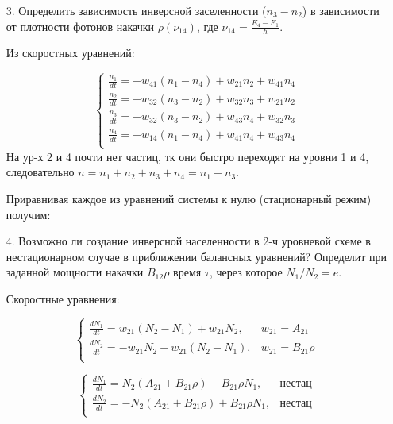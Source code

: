 \documentclass[a4paper]{article}
\begin{document}
\begin{itemize}
	\item[3.] Определить зависимость инверсной заселенности ($n_3-n_2$) в зависимости от плотности фотонов накачки $\rho(\nu_{14})$, 
		где $\nu_{14} = \frac{E_4 - E_1}{\hbar}$. \par 
		Из скоростных уравнений:  \par 
		\begin{equation}
			\begin{cases}
				\frac{n_1}{dt} = -w_{41}(n_1-n_4) + w_{21}n_2 + w_{41}n_4 \\
				\frac{n_2}{dt} = -w_{32}(n_3-n_2) + w_{32}n_3 + w_{21}n_2 \\
				\frac{n_3}{dt} = -w_{32}(n_3-n_2) + w_{43}n_4 + w_{32}n_3 \\
				\frac{n_4}{dt} = -w_{14}(n_1-n_4) + w_{41}n_4 + w_{43}n_4 \\
			\end{cases}
		\end{equation}
		На ур-х 2 и 4 почти нет частиц, тк они быстро переходят на уровни 1 и 4, следовательно $n = n_1 + n_2 + n_3 + n_4 = n_1 + n_3$. \par 
		Приравнивая каждое из уравнений системы к нулю (стационарный режим) получим: 
		\begin{center}
		\end{center}

	\item[4.] Возможно ли создание инверсной населенности в 2-ч уровневой схеме в нестационарном случае в приближении балансных уравнений? Определит при заданной мощности накачки $B_{12} \rho$ 
		время $\tau$, через которое $N_1/N_2 = e$. \par 
		Скоростные уравнения: 

		\begin{equation}
			\begin{cases}
				\frac{dN_1}{dt} = w_{21}(N_2-N_1) + w_{21}N_2, & w_{21} = A_{21} \\
				\frac{dN_2}{dt} = - w_{21}N_2 - w_{21}(N_2-N_1), & w_{21} = B_{21}\rho \\
			\end{cases}
		\end{equation}

		\begin{equation}
			\begin{cases}
				\frac{dN_1}{dt} = N_2(A_{21} + B_{21} \rho) - B_{21}\rho N_1 ,& \text{нестац}\\
				\frac{dN_2}{dt} = -N_2(A_{21} + B_{21} \rho) + B_{21}\rho N_1, & \text{нестац}\\
			\end{cases}
		\end{equation}


\end{itemize}
\end{document}
